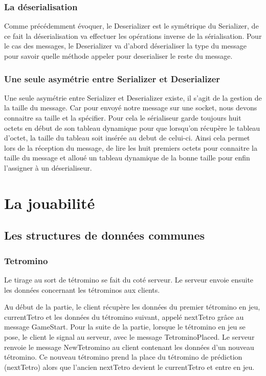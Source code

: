 \documentclass[a4paper, 12pt]{article}
\begin{document}
		\subsubsection{La déserialisation}

		Comme précédemment évoquer, le Deserializer est le symétrique du Serializer, de ce fait la déserialisation va effectuer les opérations inverse de la sérialisation. Pour le cas des messages, le Deserializer va d'abord déserialiser la type du message pour savoir quelle méthode appeler pour deserialiser le reste du message.

		\subsubsection{Une seule asymétrie entre Serializer et Deserializer}

		Une seule asymétrie entre Serializer et Deserializer existe, il s'agit de la gestion de la taille du message. Car pour envoyé notre message sur une socket, nous devons connaitre sa taille et la spécifier. Pour cela le sérialiseur garde toujours huit octets en début de son tableau dynamique pour que lorsqu'on récupère le tableau d'octet, la taille du tableau soit insérée au debut de celui-ci. Ainsi cela permet lors de la réception du message, de lire les huit premiers octets pour connaitre la taille du message et alloué un tableau dynamique de la bonne taille pour enfin l'assigner à un déserialiseur.

	
	\section{La jouabilité}
		\subsection{Les structures de données communes}

		\subsubsection{Tetromino}

			Le tirage au sort de tétromino se fait du coté serveur. Le serveur envoie ensuite les données concernant les tétrominos aux clients.
			
			Au début de la partie, le client récupère les données du premier tétromino en jeu, currentTetro et les données du tétromino suivant, appelé nextTetro grâce au message GameStart.
			Pour la suite de la partie, lorsque le tétromino en jeu se pose, le client le signal au serveur, avec le message TetrominoPlaced. Le serveur renvoie le message NewTetromino au client contenant les données d’un nouveau tétromino. Ce nouveau tétromino prend la place du tétromino de prédiction (nextTetro) alors que l’ancien nextTetro devient le currentTetro et entre en jeu.
\end{document}

